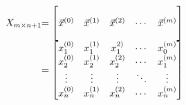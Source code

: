 \[
	\begin{array}{ l@{} l@{} } 
		X_{m \times n+1} 
		& = 
		\begin{bmatrix} \\ 
			\vec{x}^{(0)} &
			\vec{x}^{(1)} &
			\vec{x}^{(2)} &
			\cdots &
			\vec{x}^{(m)} \\ \\ 
		\end{bmatrix} \\ 
		& =
		\begin{bmatrix} 
			x_{1}^{(0)} & x_{1}^{(1)} & x_{1}^{2)} & \cdots & x_{0}^{(m)} \\
			x_{2}^{(0)} & x_{2}^{(1)} & x_{2}^{(2)} &\cdots & x_{1}^{(m)} \\ 
			\vdots & \vdots & \vdots & \ddots & \vdots \\ 
			x_{n}^{(0)} & x_{n}^{(1)} & x_{n}^{(2)} &\cdots & x_{n}^{(m)} \\ 
		\end{bmatrix} \\ 
	\end{array}
\]

